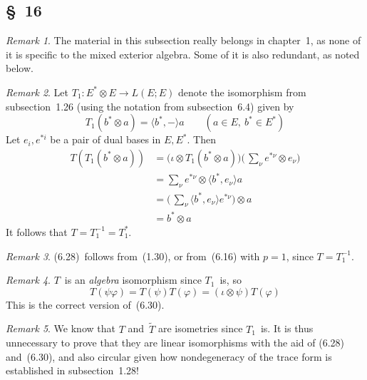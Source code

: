 \documentclass[letterpaper,12pt]{article}
\newcommand{\tprod}{\otimes}
\newcommand{\sprod}[2]{\langle#1,#2\rangle}
\theoremstyle{definition}
\theoremstyle{remark}
\newtheorem*{rmk}{Remark}
\begin{document}
\subsection*{\S~16}
\begin{rmk}
The material in this subsection really belongs in chapter~1, as none of it is specific to the mixed exterior algebra. Some of it is also redundant, as noted below.
\end{rmk}

\begin{rmk}
Let \(T_1:E^*\tprod E\to L(E;E)\) denote the isomorphism from subsection~1.26 (using the notation from subsection~6.4) given by
\[T_1(b^*\tprod a)=\sprod{b^*}{-}a\qquad(a\in E,\ b^*\in E^*)\]
Let \(e_i,e^{*i}\) be a pair of dual bases in \(E,E^*\). Then
\begin{align*}
T(T_1(b^*\tprod a))&=\bigl(\iota\tprod T_1(b^*\tprod a)\bigr)\bigl(\,\sum_{\nu}e^{*\nu}\tprod e_{\nu}\bigr)\\
	&=\sum_{\nu}e^{*\nu}\tprod\sprod{b^*}{e_{\nu}}a\\
	&=\bigl(\,\sum_{\nu}\sprod{b^*}{e_{\nu}}e^{*\nu}\bigr)\tprod a\\
	&=b^*\tprod a
\end{align*}
It follows that \(T=T_1^{-1}=T_1^*\).
\end{rmk}

\begin{rmk}
(6.28)~follows from~(1.30), or from~(6.16) with \(p=1\), since \(T=T_1^{-1}\).
\end{rmk}

\begin{rmk}
\(T\)~is an \emph{algebra} isomorphism since \(T_1\)~is, so
\[T(\psi\varphi)=T(\psi)T(\varphi)=(\iota\tprod\psi)T(\varphi)\]
This is the correct version of~(6.30).
\end{rmk}

\begin{rmk}
We know that \(T\) and~\(\widetilde{T}\) are isometries since \(T_1\)~is. It is thus unnecessary to prove that they are linear isomorphisms with the aid of (6.28) and~(6.30), and also circular given how nondegeneracy of the trace form is established in subsection~1.28!
\end{rmk}
\end{document}
